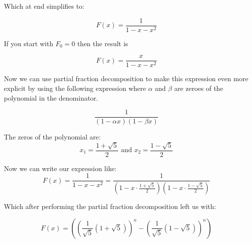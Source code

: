 Which at end simplifies to:

\[
F(x) = \frac{1}{1 - x - x^2}
\]

If you start with \(F_0 = 0\) then the result  is

\[
F(x) = \frac{x}{1 - x - x^2}
\]


Now we can use partial fraction decomposition to make this expression even more explicit
by using the following expression where \(\alpha\) and \(\beta\) are zeroes of the polynomial in the
denominator.

\[
\frac{1}{\left(1 - \alpha x\right)\left(1 - \beta x\right)}
\]

The zeros of the polynomial are:
\[
    x_1 = \frac{1 + \sqrt{5}}{2} \text{ and }  x_2 = \frac{1 - \sqrt{5}}{2}    
\]


Now we can write our expression like:
\[
F(x) = \frac{1}{1 - x - x^2} = \frac{1}{\left(1 - x \cdot \frac{1 + \sqrt{5}}{2}\right)\left(1 - x \cdot \frac{1 - \sqrt{5}}{2}\right)}
\]

Which after performing the partial fraction decomposition left us with:

\[
    F(x) = \left( {\left( \frac{1}{\sqrt{5}} (1 + \sqrt{5}) \right)}^n - {\left( \frac{1}{\sqrt{5}} (1 - \sqrt{5}) \right)}^n \right)
\]

\QED


